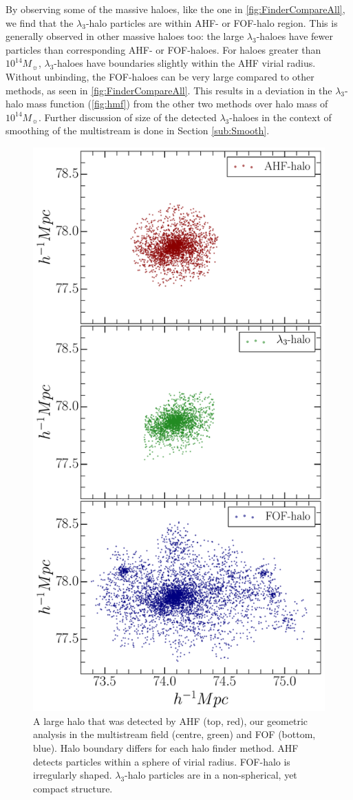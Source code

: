 \documentclass[fleqn,usenatbib,useAMS]{mnras}
\begin{document}
By observing some of the massive haloes, like the one in \autoref{fig:FinderCompareAll}, we find that the $\lambda_3$-halo particles are within AHF- or FOF-halo region. This is generally observed in other massive haloes too: the large $\lambda_3$-haloes have fewer particles than corresponding AHF- or FOF-haloes. For haloes greater than $10^{14} M_{\sun}$, $\lambda_3$-haloes have boundaries slightly within the AHF virial radius. Without unbinding, the FOF-haloes can be very large compared to other methods, as seen in \autoref{fig:FinderCompareAll}. This results in a deviation in the $\lambda_3$-halo mass function (\autoref{fig:hmf}) from the other two methods over halo mass of $10^{14} M_{\sun}$. Further discussion of size of the detected $\lambda_3$-haloes in the context of smoothing of the multistream is done in Section \ref{sub:Smooth}.   


\begin{figure}
\begin{minipage}[t]{.99\linewidth}
 \centering
 \includegraphics[width=8.cm]{fig11.pdf}
\end{minipage}\hfill
\caption{A large halo that was detected by AHF (top, red), our geometric analysis in the multistream field (centre, green) and FOF (bottom, blue). Halo boundary differs for each halo finder method. AHF detects particles within a sphere of virial radius. FOF-halo is irregularly shaped. $\lambda_3$-halo particles are in a non-spherical, yet compact structure. }
\label{fig:FinderCompareAll}
\end{figure}
\end{document}
